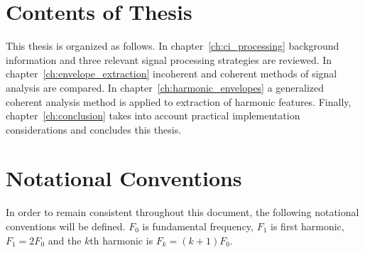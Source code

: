 \documentclass [11pt, proquest,oneside] {ganter_thesis}[2015/03/03]
\begin{document}


\section{Contents of Thesis}

This thesis is organized as follows.  In chapter~\ref{ch:ci_processing} background information and three relevant signal processing strategies are reviewed.  In chapter~\ref{ch:envelope_extraction} incoherent and coherent methods of signal analysis are compared.  In chapter~\ref{ch:harmonic_envelopes} a generalized coherent analysis method is applied to extraction of harmonic features.  Finally, chapter~\ref{ch:conclusion} takes into account practical implementation considerations and concludes this thesis.

\section{Notational Conventions}

In order to remain consistent throughout this document, the following notational conventions will be defined.  $F_0$ is fundamental frequency, $F_1$ is first harmonic, $F_1 = 2F_0$ and the $k$th harmonic is $F_k = (k+1)F_0$.
\end{document}
